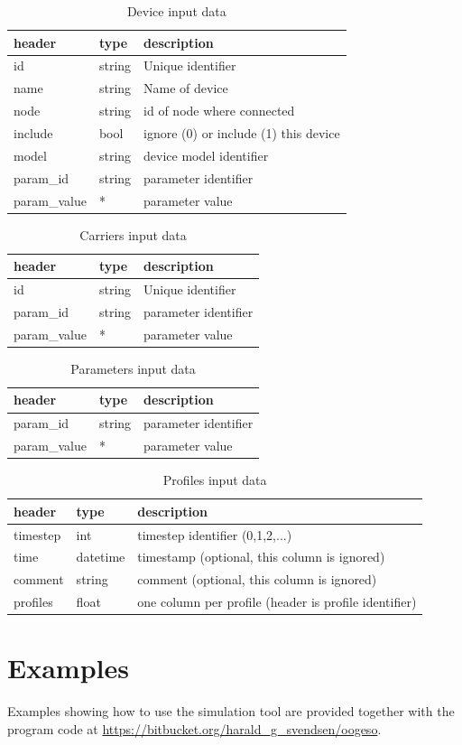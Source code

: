 \documentclass[12pt]{article}
\begin{document}
\begin{table}[h]
\caption{Device input data}
\begin{tabular}{lll}
	\hline
	header & type & description \\
	\hline
	id & string & Unique identifier \\
	name & string & Name of device \\
	node & string &  id of node where connected \\
	include & bool & ignore (0) or include (1) this device \\
	model & string & device model identifier \\
	param\_id & string & parameter identifier \\
	param\_value & * & parameter value
\end{tabular}
\end{table}

\begin{table}[h]
\caption{Carriers input data}
\begin{tabular}{lll}
	\hline
	header & type & description \\
	\hline
	id & string & Unique identifier \\
	param\_id & string & parameter identifier \\
	param\_value & * & parameter value
\end{tabular}
\end{table}

\begin{table}[h]
\caption{Parameters input data}
\begin{tabular}{lll}
	\hline
	header & type & description \\
	\hline
	param\_id & string & parameter identifier \\
	param\_value & * & parameter value
\end{tabular}
\end{table}

\begin{table}[h]
\caption{Profiles input data}
\begin{tabular}{lll}
	\hline
	header & type & description \\
	\hline
	timestep & int & timestep identifier (0,1,2,...) \\
	time & datetime & timestamp (optional, this column is ignored) \\
	comment & string & comment (optional, this column is ignored) \\
	profiles & float & one column per profile (header is profile identifier)\\
\end{tabular}
\end{table}


\section{Examples}

Examples showing how to use the simulation tool are provided together with the program code at
\url{https://bitbucket.org/harald_g_svendsen/oogeso}.





\printbibliography
\end{document}
